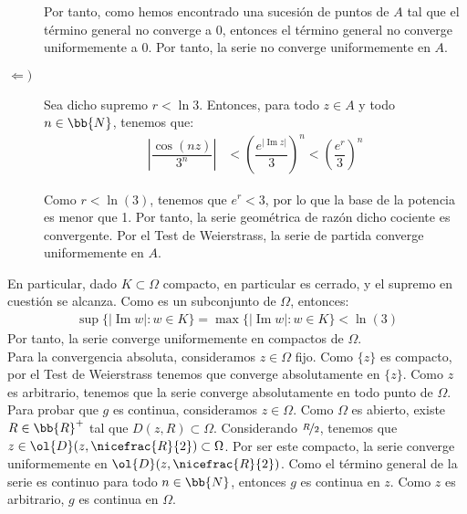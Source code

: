 \documentclass[12pt]{article}
\renewcommand{\Im}{\operatorname{Im}}
\begin{document}
\begin{ejercicio}[4 puntos]
\begin{description}
            Por tanto, como hemos encontrado una sucesión de puntos de $A$ tal que el término general no converge a $0$, entonces el término general no converge uniformemente a $0$. Por tanto, la serie no converge uniformemente en $A$.

            \item[$\Longleftarrow)$] Sea dicho supremo $r<\ln 3$. Entonces, para todo $z\in A$ y todo $n\in \bb{N}$, tenemos que:
            \begin{align*}
                \left|\dfrac{\cos(nz)}{3^n}\right| &<\left(\dfrac{e^{|\Im z|}}{3}\right)^n
                < \left(\dfrac{e^{r}}{3}\right)^n
            \end{align*}

            Como $r<\ln(3)$, tenemos que $e^{r}<3$, por lo que la base de la potencia es menor que 1. Por tanto, la serie geométrica de razón dicho cociente es convergente. Por el Test de Weierstrass, la serie de partida converge uniformemente en $A$.
        \end{description}

        En particular, dado $K\subset \Omega$ compacto, en particular es cerrado, y el supremo en cuestión se alcanza. Como es un subconjunto de $\Omega$, entonces:
        \begin{align*}
            \sup\{|\Im w| : w\in K\}=\max\{|\Im w| : w\in K\} < \ln(3)
        \end{align*}
        Por tanto, la serie converge uniformemente en compactos de $\Omega$.\\

        Para la convergencia absoluta, consideramos $z\in \Omega$ fijo. Como $\{z\}$ es compacto, por el Test de Weierstrass tenemos que converge absolutamente en $\{z\}$. Como $z$ es arbitrario, tenemos que la serie converge absolutamente en todo punto de $\Omega$.\\

        Para probar que $g$ es continua, consideramos $z\in \Omega$. Como $\Omega$ es abierto, existe $R\in \bb{R}^+$ tal que $D(z,R)\subset \Omega$. Considerando $\nicefrac{R}{2}$, tenemos que $z\in \ol{D}(z,\nicefrac{R}{2})\subset \Omega$. Por ser este compacto, la serie converge uniformemente en $\ol{D}(z,\nicefrac{R}{2})$. Como el término general de la serie es continuo para todo $n\in \bb{N}$, entonces $g$ es continua en $z$. Como $z$ es arbitrario, $g$ es continua en $\Omega$.\\


\end{ejercicio}
\end{document}
